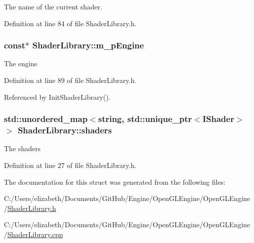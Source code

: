 The name of the current shader. 



Definition at line 84 of file Shader\+Library.\+h.

\subsubsection[{\texorpdfstring{m\+\_\+p\+Engine}{m_pEngine}}]{ const$\ast$ Shader\+Library\+::m\+\_\+p\+Engine\hspace{0.3cm}{\ttfamily [private]}}\hypertarget{struct_shader_library_a55b6f40cf696b902d6826ed4d3acae76}{}\label{struct_shader_library_a55b6f40cf696b902d6826ed4d3acae76}


The engine 



Definition at line 89 of file Shader\+Library.\+h.



Referenced by Init\+Shader\+Library().

\subsubsection[{\texorpdfstring{shaders}{shaders}}]{\setlength{\rightskip}{0pt plus 5cm}std\+::unordered\+\_\+map$<${\bf string}, std\+::unique\+\_\+ptr$<${\bf I\+Shader}$>$ $>$ Shader\+Library\+::shaders}\hypertarget{struct_shader_library_a97d6d708c2c947faefadf03ba1089f01}{}\label{struct_shader_library_a97d6d708c2c947faefadf03ba1089f01}


The shaders 



Definition at line 27 of file Shader\+Library.\+h.



The documentation for this struct was generated from the following files\+:\begin{DoxyCompactItemize}
\item 
C\+:/\+Users/elizabeth/\+Documents/\+Git\+Hub/\+Engine/\+Open\+G\+L\+Engine/\+Open\+G\+L\+Engine/\hyperlink{_shader_library_8h}{Shader\+Library.\+h}\item 
C\+:/\+Users/elizabeth/\+Documents/\+Git\+Hub/\+Engine/\+Open\+G\+L\+Engine/\+Open\+G\+L\+Engine/\hyperlink{_shader_library_8cpp}{Shader\+Library.\+cpp}\end{DoxyCompactItemize}
